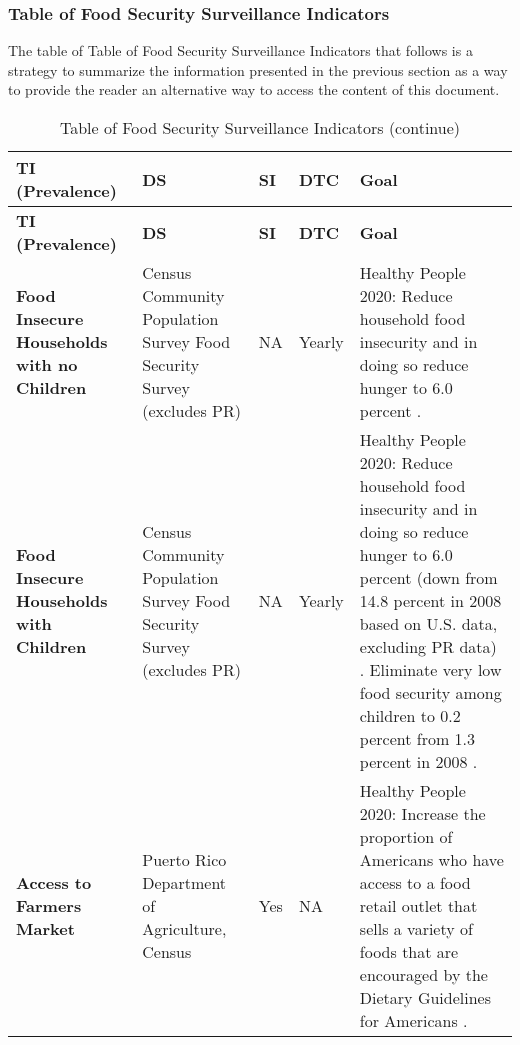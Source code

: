 \documentclass[12pt,letterpaper]{report}
\begin{document}
	\subsubsection{Table of Food Security Surveillance Indicators}
	
	The table of Table of Food Security Surveillance Indicators that follows is a strategy to summarize the information presented in the previous section as a way to provide the reader an alternative way to access the content of this document.
	
\newpage
\begin{landscape}
\begin{longtable}{|>{\raggedright\arraybackslash}p{}|>{\raggedright\arraybackslash}p{}|
>{\raggedright\arraybackslash}p{}|
>{\raggedright\arraybackslash}p{}|
>{\raggedright\arraybackslash}p{}|}
\caption{Table of Food Security Surveillance Indicators}
\hline
\textbf{TI (Prevalence)} & \textbf{DS} & \textbf{SI} & \textbf{DTC} & \textbf{Goal} \\ 
\hline
\endfirsthead
\caption[]{Table of Food Security Surveillance Indicators (continue)}
\hline
\textbf{TI (Prevalence)} & \textbf{DS} & \textbf{SI} & \textbf{DTC} & \textbf{Goal} \\ 
\hline 
\endhead %
\textbf{Food Insecure Households with no Children} 
& Census Community Population Survey Food Security Survey (excludes PR)
& NA
& Yearly
& Healthy People 2020: Reduce household food insecurity and in doing so reduce hunger to 6.0 percent \cite{Healthynutritionweight}. \\ 
\hline
\textbf{Food Insecure Households with Children}
& Census Community Population Survey Food Security Survey (excludes PR)
& NA
& Yearly
& Healthy People 2020: Reduce household food insecurity and in doing so reduce hunger to 6.0 percent (down from 14.8 percent in 2008 based on U.S. data, excluding PR data) \cite{Healthynutritionweight}. Eliminate very low food security among children to 0.2 percent from 1.3 percent in 2008 \cite{Healthynutritionweight}. \\ 
\hline
\textbf{Access to Farmers Market}
& Puerto Rico Department of Agriculture, Census
& Yes
& NA
& Healthy People 2020: Increase the proportion of Americans who have access to a food retail outlet that sells a variety of foods that are encouraged by the Dietary Guidelines for Americans \cite{Healthynutritionweight}. \\ 

\end{longtable}
\end{landscape}
\end{document}

